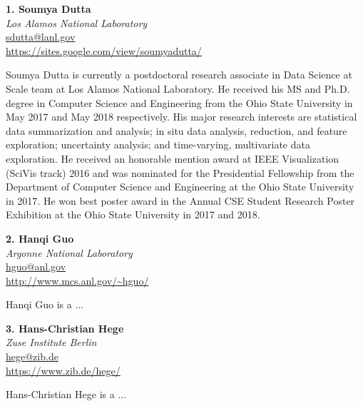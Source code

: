 \documentclass[preprint,journal]{vgtc}       %
\newcommand{\addverticalspace}{\vspace{3mm}}
\begin{document}
\addverticalspace

\noindent \textbf{1. Soumya Dutta}\\
\emph{Los Alamos National Laboratory}\\
\href{mailto:sdutta@lanl.gov}{sdutta@lanl.gov}\\
\url{https://sites.google.com/view/soumyadutta/}

\addverticalspace

Soumya Dutta is currently a postdoctoral research associate in Data Science at Scale team at Los Alamos National Laboratory. He received his MS and Ph.D. degree in Computer Science and Engineering from the Ohio State University in May 2017 and May 2018 respectively. His major research interests are statistical data summarization and analysis; in situ data analysis, reduction, and feature exploration; uncertainty analysis; and time-varying, multivariate data exploration. He received an honorable mention award at IEEE Visualization (SciVis track) 2016 and was nominated for the Presidential Fellowship from the Department of Computer Science and Engineering at the Ohio State University in 2017. He won best poster award in the Annual CSE Student Research Poster Exhibition at the Ohio State University in 2017 and 2018.

\printbibliography[title={Relevant Publications},category=Dutta]

\addverticalspace

\noindent \textbf{2. Hanqi Guo}\\
\emph{Argonne National Laboratory}\\
\href{mailto:hguo@anl.gov}{hguo@anl.gov}\\
\url{http://www.mcs.anl.gov/~hguo/}

\addverticalspace

Hanqi Guo is a ...

\printbibliography[title={Relevant Publications},category=Guo]

\addverticalspace

\noindent \textbf{3. Hans-Christian Hege}\\
\emph{Zuse Institute Berlin}\\
\href{mailto:hege@zib.de}{hege@zib.de}\\
\url{https://www.zib.de/hege/}

\addverticalspace

Hans-Christian Hege is a ...

\printbibliography[title={Relevant Publications},category=Hege]
\end{document}
